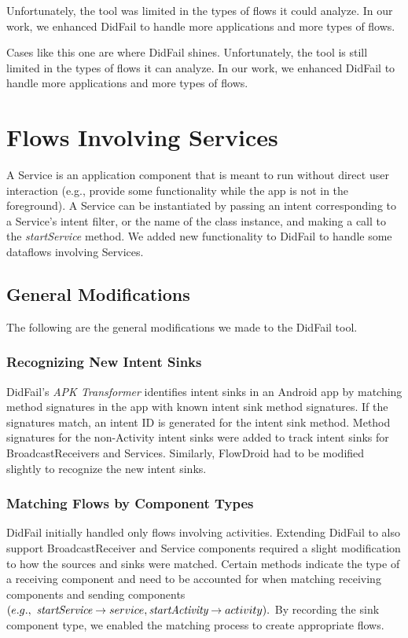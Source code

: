 Unfortunately, the tool was limited in the types of flows it could analyze. In our work, we enhanced DidFail to handle more applications and more types of flows.

Cases like this one are where DidFail shines. 
Unfortunately, the tool is still limited in the types of flows it can analyze. In our work, we enhanced DidFail to handle more applications and more types of flows.

\chapter{Flows Involving Services} \label{chap:services}
A Service is an application component that is meant to run without direct user interaction (e.g., provide some functionality while the app is not in the foreground). A Service can be instantiated by passing an intent corresponding to a Service's intent filter, or the name of the class instance, and making a call to the \emph{startService} method. We added new functionality to DidFail to handle some dataflows involving Services.  

\section{General Modifications}
The following are the general modifications we made to the DidFail tool.
\subsection{Recognizing New Intent Sinks}
DidFail's \emph{APK Transformer} identifies intent sinks in an Android app by matching method signatures in the app with known intent sink method signatures. If the signatures match, an intent ID is generated for the intent sink method. Method signatures for the non-Activity intent sinks were added to track intent sinks for BroadcastReceivers and Services. Similarly, FlowDroid had to be modified slightly to recognize the new intent sinks. 

\subsection{Matching Flows by Component Types}
DidFail initially handled only flows involving activities. Extending DidFail to also support BroadcastReceiver and Service components required a slight modification to how the sources and sinks were matched. Certain methods indicate the type of a receiving component and need to be accounted for when matching receiving components and sending components $(e.g.,\  \emph{startService} \rightarrow service, \emph{startActivity} \rightarrow activity).$ By recording the sink component type, we enabled the matching process to create appropriate flows.

